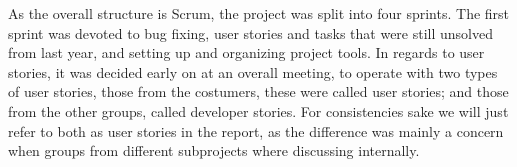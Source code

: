 As the overall structure is Scrum, the project was split into four sprints. The first sprint was devoted to bug fixing, user stories and tasks that were still unsolved from last year, and setting up and organizing project tools. In regards to user stories, it was decided early on at an overall meeting, to operate with two types of user stories, those from the costumers, these were called user stories; and those from the other groups, called developer stories. For consistencies sake we will just refer to both as user stories in the report, as the difference was mainly a concern when groups from different subprojects where discussing internally.

